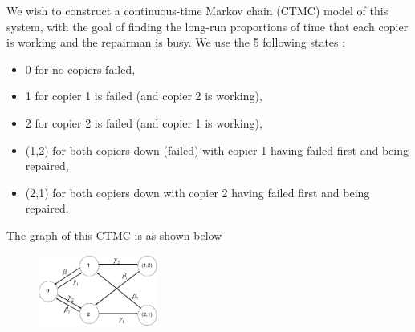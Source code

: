 \documentclass[article,12pt,a4paper]{article}
\begin{document}
	We wish to construct a continuous-time Markov chain (CTMC) model of this system, with the goal of finding the long-run proportions of time that each copier is working and the repairman is busy. 
	We use the 5 following states :
	\begin{itemize}
		\item 0 for no copiers failed,
		\item 1 for copier 1 is failed (and copier 2 is working),
		\item 2 for copier 2 is failed (and copier 1 is working),
		\item (1,2) for both copiers down (failed) with copier 1 having failed first and being repaired,
		\item (2,1) for both copiers down with copier 2 having failed first and being repaired.
	\end{itemize}
	The graph of this CTMC is as shown below 
	\begin{figure}[h]
		\centering
		\includegraphics[width=0.35\textwidth]{ctmc_1.png} 
	\end{figure}
	
\end{document}

